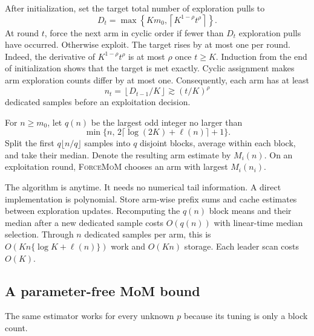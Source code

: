 \documentclass[twoside]{article}
\newcommand{\FM}{\textnormal{\textsc{ForceMoM}}}
\begin{document}
After initialization, set the target total number of exploration pulls to
\begin{equation}
 D_t=\max\left\{Km_0,
 \left\lceil K^{1-\rho}t^\rho\right\rceil\right\}.
 \label{eq:target}
\end{equation}
At round $t$, force the next arm in cyclic order if fewer than $D_t$
exploration pulls have occurred. Otherwise exploit. The target rises by at
most one per round. Indeed, the derivative of
$K^{1-\rho}t^\rho$ is at most $\rho$ once $t\geq K$. Induction from the end
of initialization shows that the target is met exactly. Cyclic assignment
makes arm exploration counts differ by at most one. Consequently, each arm has at
least
\begin{equation}
 n_t=\left\lfloor D_{t-1}/K\right\rfloor
 \gtrsim (t/K)^\rho
 \label{eq:sample-growth}
\end{equation}
dedicated samples before an exploitation decision.

For $n\geq m_0$, let $q(n)$ be the largest odd integer no larger than
\begin{equation}
 \min\{n,\,2\lceil\log(2K)+\ell(n)\rceil+1\}.
 \label{eq:q}
\end{equation}
Split the first $q\lfloor n/q\rfloor$ samples into $q$ disjoint blocks,
average within each block, and take their median. Denote the resulting arm
estimate by $M_i(n)$. On an exploitation round, \FM{} chooses an arm with
largest $M_i(n_i)$.

The algorithm is anytime. It needs no numerical tail information. A direct
implementation is polynomial. Store arm-wise prefix sums and cache estimates
between exploration updates. Recomputing the $q(n)$ block means and their
median after a new dedicated sample costs $O(q(n))$ with linear-time median
selection. Through $n$ dedicated samples per arm, this is
$O(Kn\{\log K+\ell(n)\})$ work and $O(Kn)$ storage. Each leader scan costs
$O(K)$.

\subsection{A parameter-free MoM bound}

The same estimator works for every unknown $p$ because its tuning is only a
block count.
\end{document}
